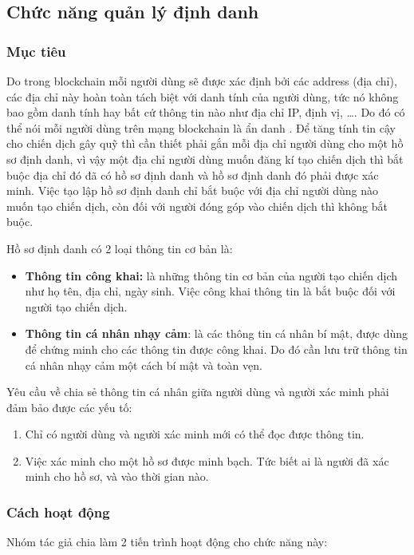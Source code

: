 \documentclass[../main-report.tex]{subfiles}
\begin{document}
\subsection{Chức năng quản lý định danh}
\subsubsection{Mục tiêu}
Do trong \gls{blockchain} mỗi người dùng sẽ được xác định bởi các \gls{address} (địa chỉ), các địa chỉ này hoàn toàn tách biệt với danh tính của người dùng, tức nó không bao gồm danh tính hay bất cứ thông tin nào như địa chỉ IP, định vị, \ldots. Do đó có thể nói mỗi người dùng trên mạng \gls{blockchain} là ẩn danh \cite{henry2018blockchain}. Để tăng tính tin cậy cho chiến dịch gây quỹ thì cần thiết phải gắn mỗi địa chỉ người dùng cho một hồ sơ định danh, vì vậy một địa chỉ người dùng muốn đăng kí tạo chiến dịch thì bắt buộc địa chỉ đó đã có hồ sơ định danh và hồ sơ định danh đó phải được xác minh. Việc tạo lập hồ sơ định danh chỉ bắt buộc với địa chỉ người dùng nào muốn tạo chiến dịch, còn đối với người đóng góp vào chiến dịch thì không bắt buộc.

Hồ sơ định danh có 2 loại thông tin cơ bản là: 

\begin{itemize}
\item \textbf{Thông tin công khai:} là những thông tin cơ bản của người tạo chiến dịch như họ tên, địa chỉ, ngày sinh. Việc công khai thông tin là bắt buộc đối với người tạo chiến dịch.
\item \textbf{Thông tin cá nhân nhạy cảm}: là các thông tin cá nhân bí mật, được dùng để chứng minh cho các thông tin được công khai. Do đó cần lưu trữ thông tin cá nhân nhạy cảm một cách bí mật và toàn vẹn.
\end{itemize}

Yêu cầu về chia sẻ thông tin cá nhân giữa người dùng và người xác minh phải đảm bảo được các yếu tố:

\begin{enumerate}
\item Chỉ có người dùng và người xác minh mới có thể đọc được thông tin.
\item Việc xác minh cho một hồ sơ được minh bạch. Tức biết ai là người đã xác minh cho hồ sơ, và vào thời gian nào.
\end{enumerate}

\subsubsection{Cách hoạt động}
Nhóm tác giả chia làm 2 tiến trình hoạt động cho chức năng này:
\end{document}
